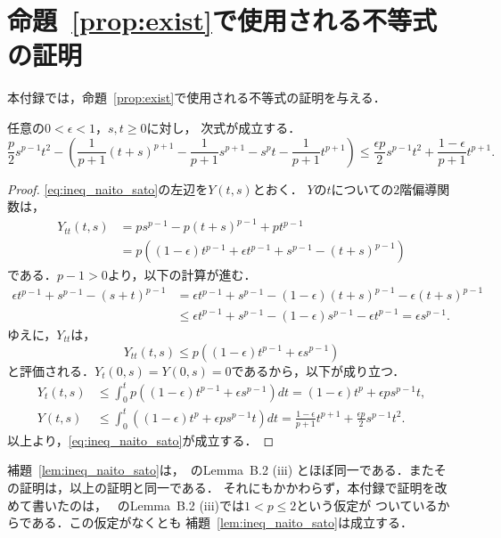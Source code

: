 \section{命題~\ref{prop:exist}で使用される不等式の証明}
\label{sec:lem_naito_sato} 

本付録では，命題~\ref{prop:exist}で使用される不等式の証明を与える．

\begin{lem} \label{lem:ineq_naito_sato}
 任意の$0 < \epsilon < 1$，$s, t \geq 0$に対し，
 次式が成立する．
 \begin{equation}
  \frac{p}{2}s^{p-1}t^2 - 
   \left( \frac{1}{p+1}(t+s)^{p+1} -
    \frac{1}{p+1}s^{p+1} - s^pt - \frac{1}{p+1}t^{p+1}
   \right) \leq \frac{\epsilon p}{2} s^{p-1}
   t^2 + \frac{1-\epsilon}{p+1} t^{p+1}. \label{eq:ineq_naito_sato}
 \end{equation}
\end{lem}
 
\begin{proof}
 \eqref{eq:ineq_naito_sato}の左辺を$Y(t, s)$とおく．
 $Y$の$t$についての$2$階偏導関数は，
 \begin{align*}
  Y_{tt}(t, s) &= p s^{p-1} - p(t+s)^{p-1} + pt^{p-1} \\
  &= p \left( (1- \epsilon) t^{p-1} + \epsilon t^{p-1} + s^{p-1} -
  (t+s)^{p-1} \right)
 \end{align*}
 である．$p - 1 > 0$より，以下の計算が進む．
 \begin{align*}
  \epsilon t^{p-1} + s^{p-1} - (s+t)^{p-1} &= 
  \epsilon t^{p-1} + s^{p-1} - (1-\epsilon)(t+s)^{p-1} - \epsilon
  (t+s)^{p-1} \\
  & \leq \epsilon t^{p-1} + s^{p-1} - (1-\epsilon) s^{p-1} - \epsilon
  t^{p-1} = \epsilon s^{p-1}.
 \end{align*}
 ゆえに，$Y_{tt}$は，
 \[
  Y_{tt}(t, s) \leq p \left( (1-\epsilon) t^{p-1} + \epsilon s^{p-1} \right)
 \]
 と評価される．$Y_t(0, s) = Y(0, s) = 0$であるから，以下が成り立つ．
 \begin{align*}
  Y_t(t, s) &\leq \int_0^t  p \left( (1-\epsilon) t^{p-1} + \epsilon
  s^{p-1} \right) dt = (1 - \epsilon) t^p + \epsilon p s^{p-1} t, \\
  Y(t, s) &\leq \int_0^t \left( (1 - \epsilon) t^p + \epsilon p
  s^{p-1} t \right)dt = \frac{1 -\epsilon}{p+1} t^{p+1} +
  \frac{\epsilon p}{2}s^{p-1}t^2.
 \end{align*}
 以上より，\eqref{eq:ineq_naito_sato}が成立する．\qedhere
\end{proof}

補題~\ref{lem:ineq_naito_sato}は，\cite{MR2886160}~のLemma~B.2 (iii)
とほぼ同一である．またその証明は，以上の証明と同一である．
それにもかかわらず，本付録で証明を改めて書いたのは，
\cite{MR2886160}~のLemma~B.2 (iii)では$1 < p \leq 2$という仮定が
ついているからである．この仮定がなくとも
補題~\ref{lem:ineq_naito_sato}は成立する．

